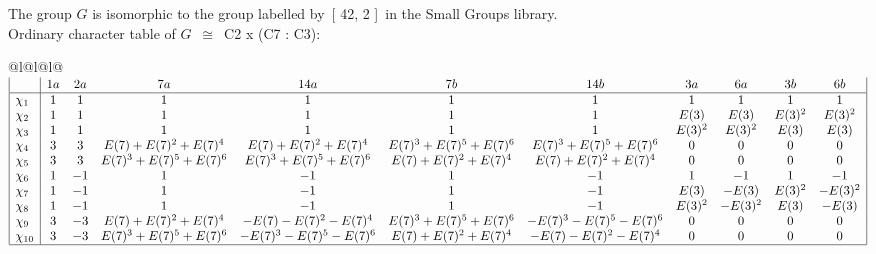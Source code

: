 \documentclass[varwidth=\maxdimen,border=10]{standalone}
\begin{document}
The group $G$ is isomorphic to the group labelled by\ [ 42, 2 ]\ in the Small Groups library.\\
Ordinary character table of $G$\ $\cong$\ C2 x (C7 : C3):\\
\begin{center}
\begin{tabular}{@{}l@{}l@{}l@{}}
\hline
\(\begin{array}{|l|cccccccccc|}
  & 1a & 2a & 7a & 14a & 7b & 14b & 3a & 6a & 3b & 6b\\ \hline
\chi_{1} & 1 & 1 & 1 & 1 & 1 & 1 & 1 & 1 & 1 & 1\\
\chi_{2} & 1 & 1 & 1 & 1 & 1 & 1 & E(3) & E(3) & E(3)^{2} & E(3)^{2}\\
\chi_{3} & 1 & 1 & 1 & 1 & 1 & 1 & E(3)^{2} & E(3)^{2} & E(3) & E(3)\\
\chi_{4} & 3 & 3 & E(7)+E(7)^{2}+E(7)^{4} & E(7)+E(7)^{2}+E(7)^{4} & E(7)^{3}+E(7)^{5}+E(7)^{6} & E(7)^{3}+E(7)^{5}+E(7)^{6} & 0 & 0 & 0 & 0\\
\chi_{5} & 3 & 3 & E(7)^{3}+E(7)^{5}+E(7)^{6} & E(7)^{3}+E(7)^{5}+E(7)^{6} & E(7)+E(7)^{2}+E(7)^{4} & E(7)+E(7)^{2}+E(7)^{4} & 0 & 0 & 0 & 0\\
\chi_{6} & 1 & -1 & 1 & -1 & 1 & -1 & 1 & -1 & 1 & -1\\
\chi_{7} & 1 & -1 & 1 & -1 & 1 & -1 & E(3) & -E(3) & E(3)^{2} & -E(3)^{2}\\
\chi_{8} & 1 & -1 & 1 & -1 & 1 & -1 & E(3)^{2} & -E(3)^{2} & E(3) & -E(3)\\
\chi_{9} & 3 & -3 & E(7)+E(7)^{2}+E(7)^{4} & -E(7)-E(7)^{2}-E(7)^{4} & E(7)^{3}+E(7)^{5}+E(7)^{6} & -E(7)^{3}-E(7)^{5}-E(7)^{6} & 0 & 0 & 0 & 0\\
\chi_{10} & 3 & -3 & E(7)^{3}+E(7)^{5}+E(7)^{6} & -E(7)^{3}-E(7)^{5}-E(7)^{6} & E(7)+E(7)^{2}+E(7)^{4} & -E(7)-E(7)^{2}-E(7)^{4} & 0 & 0 & 0 & 0\\
\hline
\end{array}\)\\
\end{tabular}
\end{center}
\end{document}
